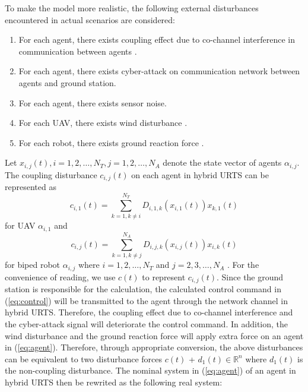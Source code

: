 \documentclass{ieeeaccess}
\begin{document}
To make the model more realistic, the following external disturbances encountered in actual scenarios are considered:
\begin{enumerate}
    \item For each agent, there exists coupling effect due to co-channel interference in communication between agents \cite{9834947}.
    \item For each agent, there exists cyber-attack on communication network between agents and ground station.
    \item For each agent, there exists sensor noise.
    \item For each UAV, there exists wind disturbance \cite{9075385}.
    \item For each robot, there exists ground reaction force \cite{chen2013human}. 
\end{enumerate}
Let $x_{i,j}(t), i=1,2,\dots,N_T, j=1,2,\dots,N_A$ denote the state vector of agents $\alpha_{i,j}$. The coupling disturbance $c_{i,j}(t)$ on each agent in hybrid URTS can be represented as \begin{equation} \label{eq:UAV couple}
    c_{i,1}(t) = \sum_{k = 1, k \neq i}^{N_T}D_{i, 1, k}(x_{i, 1}(t))x_{k, 1}(t)
\end{equation} for UAV $\alpha_{i, 1}$ and \begin{equation} \label{eq:robot couple}
    c_{i,j}(t) = \sum_{k = 1, k \neq j}^{N_A}D_{i, j, k}(x_{i, j}(t))x_{i, k}(t)
\end{equation} for biped robot $\alpha_{i, j}$ where $i=1,2,\dots,N_T$ and $j=2,3,\dots,N_A$ \cite{9834947}. For the convenience of reading, we use $c(t)$ to represent $c_{i,j}(t)$. Since the ground station is responsible for the calculation, the calculated control command in (\ref{eq:control}) will be transmitted to the agent through the network channel in hybrid URTS. Therefore, the coupling effect due to co-channel interference and the cyber-attack signal will deteriorate the control command. In addition, the wind disturbance and the ground reaction force will apply extra force on an agent in (\ref{eq:agent}). Therefore, through appropriate conversion, the above disturbances can be equivalent to two disturbance forces $c(t)$ + $d_1(t)\in\mathbb{R}^n$ where $d_1(t)$ is the non-coupling disturbance. The nominal system in (\ref{eq:agent}) of an agent in hybrid URTS then be rewrited as the following real system:
\end{document}
